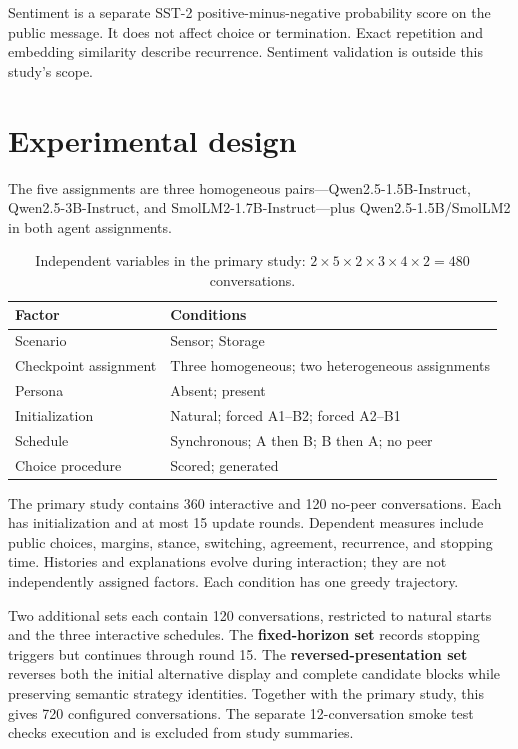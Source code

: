 \documentclass[11pt,a4paper]{article}
\begin{document}
Sentiment is a separate SST-2 positive-minus-negative probability score on the public message. It does not affect choice or termination. Exact repetition and embedding similarity describe recurrence. Sentiment validation is outside this study's scope.

\section{Experimental design}
The five assignments are three homogeneous pairs---Qwen2.5-1.5B-Instruct, Qwen2.5-3B-Instruct, and SmolLM2-1.7B-Instruct---plus Qwen2.5-1.5B/SmolLM2 in both agent assignments.

\begin{table}[htbp]
\centering\small
\begin{tabularx}{\linewidth}{@{}p{3.2cm}X@{}}
\toprule
Factor & Conditions\\
\midrule
Scenario & Sensor; Storage\\
Checkpoint assignment & Three homogeneous; two heterogeneous assignments\\
Persona & Absent; present\\
Initialization & Natural; forced A1--B2; forced A2--B1\\
Schedule & Synchronous; A then B; B then A; no peer\\
Choice procedure & Scored; generated\\
\bottomrule
\end{tabularx}
\caption{Independent variables in the primary study: $2\times5\times2\times3\times4\times2=480$ conversations.}
\end{table}

The primary study contains 360 interactive and 120 no-peer conversations. Each has initialization and at most 15 update rounds. Dependent measures include public choices, margins, stance, switching, agreement, recurrence, and stopping time. Histories and explanations evolve during interaction; they are not independently assigned factors. Each condition has one greedy trajectory.

Two additional sets each contain 120 conversations, restricted to natural starts and the three interactive schedules. The \textbf{fixed-horizon set} records stopping triggers but continues through round 15. The \textbf{reversed-presentation set} reverses both the initial alternative display and complete candidate blocks while preserving semantic strategy identities. Together with the primary study, this gives 720 configured conversations. The separate 12-conversation smoke test checks execution and is excluded from study summaries.
\end{document}
